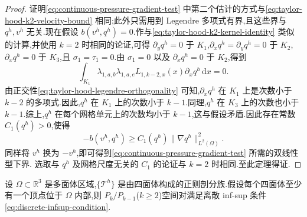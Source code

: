 \begin{proof}
证明\cref{eq:continuous-pressure-gradient-test} 中第二个估计的方式与\cref{eq:taylor-hood-k2-velocity-bound} 相同;此外只需用到 Legendre 多项式有界,且这些界与 $q^h,v^h$ 无关.现在假设 $b(v^h,q^h)=0$.作与\cref{eq:taylor-hood-k2-kernel-identity} 类似的计算,并使用 $k=2$ 时相同的论证,可得 $\partial_yq^h=0$ 于 $K_1$,$\partial_xq^h=\partial_yq^h=0$ 于 $K_2$,$\partial_xq^h=0$ 于 $K_3$,且 $\sigma_1=\tau_1=0$.由 $\sigma_1=0$ 以及 $\partial_xq^h=0$ 于 $K_2$,得到
\[
  \int_{K_1}\lambda_{1,a,b}\lambda_{1,a,e}
       L_{1,k-2,x}(x)\partial_xq^h\,\mathrm{d}x=0.
\]
由正交性\cref{eq:taylor-hood-legendre-orthogonality} 可知,$\partial_xq^h$ 在 $K_1$ 上是次数小于 $k-2$ 的多项式.因此,$q^h$ 在 $K_1$ 上的次数小于 $k-1$.同理,$q^h$ 在 $K_3$ 上的次数也小于 $k-1$.综上,$q^h$ 在每个网格单元上的次数均小于 $k-1$,这与假设矛盾.因此存在常数 $C_1(q^h)>0$,使得
\[
  -b(v^h,q^h)\ge C_1(q^h)\|\nabla q^h\|_{L^2(\Omega)}^2.
\]
同样将 $v^h$ 换为 $-v^h$,即可得到\cref{eq:continuous-pressure-gradient-test} 所需的双线性型下界.
选取与 $q^h$ 及网格尺度无关的 $C_1$ 的论证与 $k=2$ 时相同.至此定理得证.
\end{proof}

\begin{theorem}[三维情形]\label{thm:taylor-hood-3d}
设 $\Omega\subset\mathbb{R}^3$ 是多面体区域,$\{\mathcal{T}^h\}$ 是由四面体构成的正则剖分族.假设每个四面体至少有一个顶点位于 $\Omega$ 内部,则 $P_k/P_{k-1}$($k\ge2$)空间对满足离散 inf-sup 条件\cref{eq:discrete-infsup-condition}.
\end{theorem}

